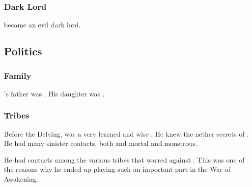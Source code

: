 \subsubsection{Dark Lord}
\Zachirah{} became an evil dark lord. 










\subsection{Politics}





\subsubsection{Family}
\Netzach's father was . 
His daughter was . 





\subsubsection{Tribes}
Before the Delving, \Zachirah was a very learned and wise \resphan.
He knew the nether secrets of \Nyx.
He had many sinister contacts, both \resphan and mortal and monstrous. 

He had contacts among the various tribes that warred against \Merkyrah. 
This was one of the reasons why he ended up playing such an important part in the War of Awakening.















